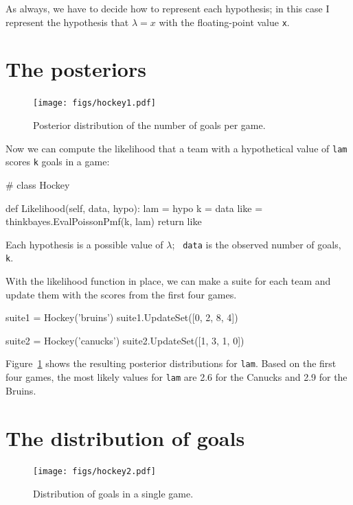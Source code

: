 \documentclass[12pt]{book}
\theoremstyle{exercise}
\begin{document}
As always, we have to decide how to represent each hypothesis; in
this case I represent the hypothesis that $\lambda=x$ with the
floating-point value {\tt x}. 



\section{The posteriors}

\begin{figure}
\centerline{\texttt{[image: figs/hockey1.pdf]}}
\caption{Posterior distribution of the number of
goals per game.}
\label{fig.hockey1}
\end{figure}

Now we can compute the likelihood that a team with a hypothetical
value of {\tt lam} scores {\tt k} goals in a game:

\begin{code}
# class Hockey

    def Likelihood(self, data, hypo):
        lam = hypo
        k = data
        like = thinkbayes.EvalPoissonPmf(k, lam)
        return like
\end{code}

Each hypothesis is a possible value of $\lambda$;  {\tt
  data} is the observed number of goals, {\tt k}.

With the likelihood function in place, we can make a suite for each
team and update them with the scores from the first four games.

\begin{code}
    suite1 = Hockey('bruins')
    suite1.UpdateSet([0, 2, 8, 4])
     
    suite2 = Hockey('canucks')
    suite2.UpdateSet([1, 3, 1, 0])
\end{code}  

Figure~\ref{fig.hockey1} shows the resulting posterior distributions
for {\tt lam}.  Based on the first four games, the most likely
values for {\tt lam} are 2.6 for the Canucks and 2.9 for the Bruins.


\section{The distribution of goals}

\begin{figure}
\centerline{\texttt{[image: figs/hockey2.pdf]}}
\caption{Distribution of goals in a single game.}
\label{fig.hockey2}
\end{figure}
\end{document}
